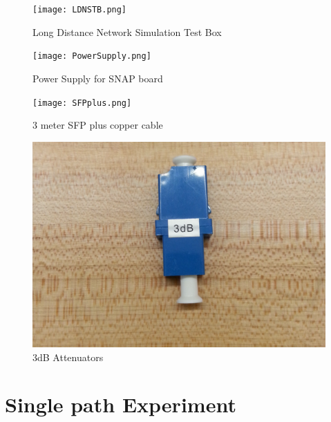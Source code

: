 \documentclass{article}
\begin{document}
\begin{figure}[h!]
\centering
	\begin{minipage}{.4\textwidth}
		\centering
		\texttt{[image: LDNSTB.png]}
		\caption{Long Distance Network Simulation Test Box}
	\end{minipage}
	\begin{minipage}{.4\textwidth}
		\centering
		\texttt{[image: PowerSupply.png]}
		\caption{Power Supply for SNAP board}
	\end{minipage}
\end{figure}

\begin{figure}[h!]
\centering
	\begin{minipage}{.4\textwidth}
		\centering
		\texttt{[image: SFPplus.png]}
		\caption{3 meter SFP plus copper cable}
	\end{minipage}
	\begin{minipage}{.4\textwidth}
		\centering
		\includegraphics[width = .8\linewidth]{3db.png}
		\caption{3dB Attenuators}
	\end{minipage}
\end{figure}




\section*{Single path Experiment}
\end{document}
